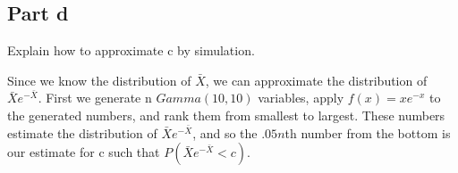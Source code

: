 \documentclass{article}
\begin{document}
\subsection*{Part d}

Explain how to approximate c by simulation.

Since we know the distribution of $\bar{X}$, we can approximate the distribution of $\bar{X}e^{-\bar{X}}$. First we generate n $Gamma(10, 10)$ variables, apply $f(x) = xe^{-x}$ to the generated numbers, and rank them from smallest to largest. These numbers estimate the distribution of $\bar{X}e^{-\bar{X}}$, and so the $.05n$th number from the bottom is our estimate for c such that $P(\bar{X}e^{-\bar{X}} < c)$.
\end{document}
